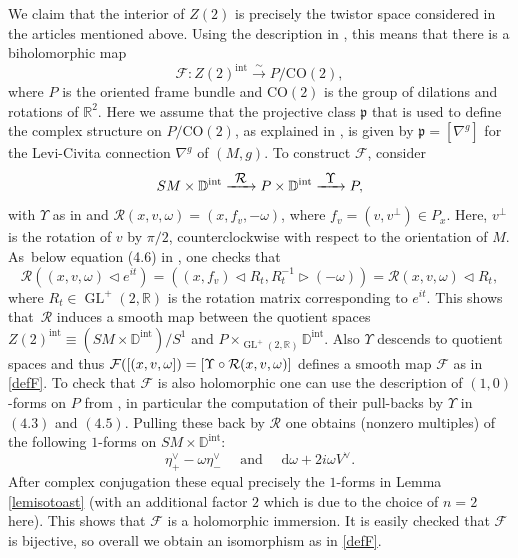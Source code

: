 \documentclass[JEP,XML,SOM,Unicode,published]{cedram}
\newcommand\To[1]{\mathchoice{\xrightarrow{\textstyle\kern4pt#1\kern3pt}}{\stackrel{#1}{\longrightarrow}}{}{}}
\newcommand{\isom}{\stackrel{\sim}{\longrightarrow}}
\DeclareMathOperator{\GL}{GL}
\theoremstyle{plain}
\theoremstyle{definition}
\newcommand{\R}{\mathbb{R}}
\newcommand{\DD}{\mathbb{D}}
\renewcommand{\d}{\mathrm{d}}
\newcommand{\interior}{\mathrm{int}}
\newcommand{\1}{{\bf 1}}
\let\act\triangleleft
\let\lact\triangleright
\begin{document}
We claim that the interior of $Z(2)$ is precisely the twistor space considered in the articles mentioned above. Using the description in \cite{MePa20}, this means that there is a biholomorphic map
\begin{equation} \label{defF}
\mathcal{F}: Z(2)^\interior \isom P/\mathrm{CO}(2),
\end{equation}
where $P$ is the oriented frame bundle and $\mathrm{CO}(2)$ is the group of dilations and rotations of $\R^2$. Here we assume that the projective class $\mathfrak{p}$ that is used to define the complex structure on $P/\mathrm{CO}(2)$, as explained in \cite[\S 4.1]{MePa20}, is given by $\mathfrak{p}=[\nabla^g]$ for the Levi-Civita connection $\nabla^g$ of $(M,g)$. To construct $\mathcal{F}$, consider
\begin{equation*}
SM\times \DD^\interior \To{\mathcal{R}} P \times \DD^\interior \To{\Upsilon} P,
\end{equation*}
with $\Upsilon$ as in \cite[\S 4.1]{MePa20} and $\mathcal{R}(x,v,\omega)=(x,f_v,-\omega)$, where $f_v=(v,v^\perp)\in P_x$. Here, $v^\perp$ is the rotation of $v$ by $\pi/2$, counterclockwise with respect to the orientation of $M$. As~below equation (4.6) in \cite{MePa20}, one checks that
\begin{equation*}
\mathcal{R}\left((x,v,\omega)\act e^{it}\right) = \left((x,f_v)\act R_t, R_t^{-1}\lact (-\omega)\right) = \mathcal{R}(x,v,\omega)\act R_t,
\end{equation*}
where $R_t\in \GL^+(2,\R)$ is the rotation matrix corresponding to $e^{it}$. This shows that~$\mathcal{R}$ induces a smooth map between the quotient spaces $Z(2)^\interior \equiv (SM\times \DD^{\interior})/S^1$ and $P\times_{\GL^+(2,\R)}\DD^{\interior}$. Also $\Upsilon$ descends to quotient spaces and thus $\mathcal{F}([(x,v,\omega])=[\Upsilon\circ\nobreak\mathcal{R}(x,v,\omega)]$ defines a smooth map $\mathcal{F}$ as in \eqref{defF}. To check that $\mathcal{F}$ is also holomorphic one can use the description of $(1,0)$-forms on $P$ from \cite{MePa20}, in particular the computation of their pull-backs by $\Upsilon$ in $(4.3)$ and $(4.5)$. Pulling these back by $\mathcal{R}$ one obtains (nonzero multiples) of the following $1$-forms on $SM\times \DD^\interior$:
\begin{equation*}
\eta_+^\vee - \omega \eta_-^\vee \quad \text{ and } \quad \d \omega + 2i \omega V^\vee.
\end{equation*}
After complex conjugation these equal precisely the $1$-forms in Lemma \ref{lemisotoast} (with an additional factor $2$ which is due to the choice of $n=2$ here). This shows that $\mathcal{F}$ is a holomorphic immersion. It is easily checked that $\mathcal{F}$ is bijective, so overall we obtain an isomorphism as in \eqref{defF}.
\end{document}
